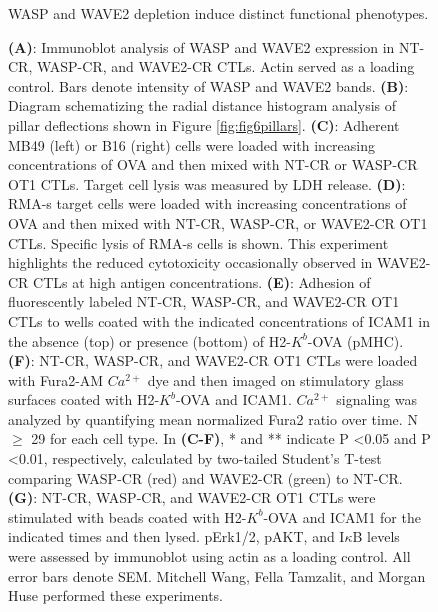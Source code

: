 \clearpage
\begin{figure}[htbp]
	\caption{WASP and WAVE2 depletion induce distinct functional phenotypes.}
    \caption*{\textbf{(A)}: Immunoblot analysis of WASP and WAVE2 expression in NT-CR, WASP-CR, and WAVE2-CR CTLs. Actin served as a loading control. Bars denote intensity of WASP and WAVE2 bands. \textbf{(B)}: Diagram schematizing the radial distance histogram analysis of pillar deflections shown in Figure \ref{fig:fig6pillars}. \textbf{(C)}: Adherent MB49 (left) or B16 (right) cells were loaded with increasing concentrations of OVA and then mixed with NT-CR or WASP-CR OT1 CTLs. Target cell lysis was measured by LDH release. \textbf{(D)}: RMA-s target cells were loaded with increasing concentrations of OVA and then mixed with NT-CR, WASP-CR, or WAVE2-CR OT1 CTLs. Specific lysis of RMA-s cells is shown. This experiment highlights the reduced cytotoxicity occasionally observed in WAVE2-CR CTLs at high antigen concentrations. \textbf{(E)}: Adhesion of fluorescently labeled NT-CR, WASP-CR, and WAVE2-CR OT1 CTLs to wells coated with the indicated concentrations of ICAM1 in the absence (top) or presence (bottom) of H2-$K^{b}$-OVA (pMHC). \textbf{(F)}: NT-CR, WASP-CR, and WAVE2-CR OT1 CTLs were loaded with Fura2-AM $Ca^{2+}$ dye and then imaged on stimulatory glass surfaces coated with H2-$K^{b}$-OVA and ICAM1. $Ca^{2+}$ signaling was analyzed by quantifying mean normalized Fura2 ratio over time. N $\geq$ 29 for each cell type. In \textbf{(C-F)}, * and ** indicate P \textless 0.05 and P \textless 0.01, respectively, calculated by two-tailed Student’s T-test comparing WASP-CR (red) and WAVE2-CR (green) to NT-CR. \textbf{(G)}: NT-CR, WASP-CR, and WAVE2-CR OT1 CTLs were stimulated with beads coated with H2-$K^{b}$-OVA and ICAM1 for the indicated times and then lysed. pErk1/2, pAKT, and I$\kappa$B levels were assessed by immunoblot using actin as a loading control. All error bars denote SEM. Mitchell Wang, Fella Tamzalit, and Morgan Huse performed these experiments.}
    \label{fig:fig6supp}
\end{figure}
\clearpage
